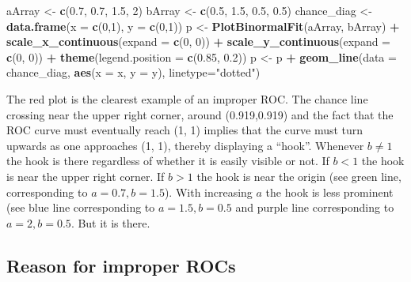 \documentclass[
]{book}
\newenvironment{Shaded}{\begin{snugshade}}{\end{snugshade}}
\newcommand{\DataTypeTok}[1]{\textcolor[rgb]{0.13,0.29,0.53}{#1}}
\newcommand{\DecValTok}[1]{\textcolor[rgb]{0.00,0.00,0.81}{#1}}
\newcommand{\FloatTok}[1]{\textcolor[rgb]{0.00,0.00,0.81}{#1}}
\newcommand{\KeywordTok}[1]{\textcolor[rgb]{0.13,0.29,0.53}{\textbf{#1}}}
\newcommand{\NormalTok}[1]{#1}
\newcommand{\OperatorTok}[1]{\textcolor[rgb]{0.81,0.36,0.00}{\textbf{#1}}}
\newcommand{\StringTok}[1]{\textcolor[rgb]{0.31,0.60,0.02}{#1}}
\begin{document}
\begin{Shaded}
\begin{Highlighting}[]
\NormalTok{  aArray <-}\StringTok{ }\KeywordTok{c}\NormalTok{(}\FloatTok{0.7}\NormalTok{, }\FloatTok{0.7}\NormalTok{, }\FloatTok{1.5}\NormalTok{, }\DecValTok{2}\NormalTok{)}
\NormalTok{  bArray <-}\StringTok{ }\KeywordTok{c}\NormalTok{(}\FloatTok{0.5}\NormalTok{, }\FloatTok{1.5}\NormalTok{, }\FloatTok{0.5}\NormalTok{, }\FloatTok{0.5}\NormalTok{)}
\NormalTok{  chance_diag <-}\StringTok{ }\KeywordTok{data.frame}\NormalTok{(}\DataTypeTok{x =} \KeywordTok{c}\NormalTok{(}\DecValTok{0}\NormalTok{,}\DecValTok{1}\NormalTok{), }\DataTypeTok{y =} \KeywordTok{c}\NormalTok{(}\DecValTok{0}\NormalTok{,}\DecValTok{1}\NormalTok{))}
\NormalTok{  p <-}\StringTok{ }\KeywordTok{PlotBinormalFit}\NormalTok{(aArray, bArray) }\OperatorTok{+}
\StringTok{    }\KeywordTok{scale_x_continuous}\NormalTok{(}\DataTypeTok{expand =} \KeywordTok{c}\NormalTok{(}\DecValTok{0}\NormalTok{, }\DecValTok{0}\NormalTok{)) }\OperatorTok{+}\StringTok{ }
\StringTok{    }\KeywordTok{scale_y_continuous}\NormalTok{(}\DataTypeTok{expand =} \KeywordTok{c}\NormalTok{(}\DecValTok{0}\NormalTok{, }\DecValTok{0}\NormalTok{)) }\OperatorTok{+}
\StringTok{    }\KeywordTok{theme}\NormalTok{(}\DataTypeTok{legend.position =} \KeywordTok{c}\NormalTok{(}\FloatTok{0.85}\NormalTok{, }\FloatTok{0.2}\NormalTok{))}
\NormalTok{p <-}\StringTok{ }\NormalTok{p }\OperatorTok{+}\StringTok{ }\KeywordTok{geom_line}\NormalTok{(}\DataTypeTok{data =}\NormalTok{ chance_diag, }\KeywordTok{aes}\NormalTok{(}\DataTypeTok{x =}\NormalTok{ x, }\DataTypeTok{y =}\NormalTok{ y), }\DataTypeTok{linetype=}\StringTok{"dotted"}\NormalTok{)}
\end{Highlighting}
\end{Shaded}

The red plot is the clearest example of an improper ROC. The chance line crossing near the upper right corner, around (0.919,0.919) and the fact that the ROC curve must eventually reach (1, 1) implies that the curve must turn upwards as one approaches (1, 1), thereby displaying a ``hook''. Whenever \(b \ne 1\) the hook is there regardless of whether it is easily visible or not. If \(b < 1\) the hook is near the upper right corner. If \(b > 1\) the hook is near the origin (see green line, corresponding to \(a = 0.7, b = 1.5\)). With increasing \(a\) the hook is less prominent (see blue line corresponding to \(a = 1.5, b = 0.5\) and purple line corresponding to \(a = 2, b = 0.5\). But it is there.

\hypertarget{reason-for-improper-rocs}{%
\subsection{Reason for improper ROCs}\label{reason-for-improper-rocs}}
\end{document}
